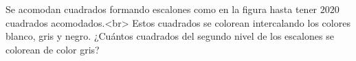 Se acomodan cuadrados formando escalones como en la figura hasta tener $2020$ cuadrados acomodados.<br>
Estos cuadrados se colorean intercalando los colores blanco, gris y negro. ¿Cuántos cuadrados del segundo nivel de los escalones se colorean de color gris?